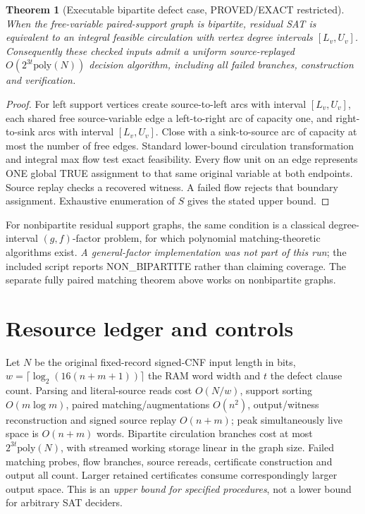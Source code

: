 \documentclass[10pt]{article}
\newtheorem{theorem}{Theorem}
\begin{document}
\begin{theorem}[Executable bipartite defect case, PROVED/EXACT restricted]
When the free-variable paired-support graph is bipartite, residual SAT is equivalent to an integral feasible circulation with vertex degree intervals $[L_v,U_v]$. Consequently these checked inputs admit a uniform source-replayed $O(2^{3t}\mathrm{poly}(N))$ decision algorithm, including all failed branches, construction and verification.
\end{theorem}
\begin{proof}
For left support vertices create source-to-left arcs with interval $[L_v,U_v]$, each shared free source-variable edge a left-to-right arc of capacity one, and right-to-sink arcs with interval $[L_v,U_v]$. Close with a sink-to-source arc of capacity at most the number of free edges. Standard lower-bound circulation transformation and integral max flow test exact feasibility. Every flow unit on an edge represents ONE global TRUE assignment to that same original variable at both endpoints. Source replay checks a recovered witness. A failed flow rejects that boundary assignment. Exhaustive enumeration of $S$ gives the stated upper bound.
\end{proof}
For nonbipartite residual support graphs, the same condition is a classical degree-interval $(g,f)$-factor problem, for which polynomial matching-theoretic algorithms exist. \emph{A general-factor implementation was not part of this run}; the included script reports NON\_BIPARTITE rather than claiming coverage. The separate fully paired matching theorem above works on nonbipartite graphs.

\section{Resource ledger and controls}
Let $N$ be the original fixed-record signed-CNF input length in bits, $w=\lceil\log_2(16(n+m+1))\rceil$ the RAM word width and $t$ the defect clause count. Parsing and literal-source reads cost $O(N/w)$, support sorting $O(m\log m)$, paired matching/augmentations $O(n^2)$, output/witness reconstruction and signed source replay $O(n+m)$; peak simultaneously live space is $O(n+m)$ words. Bipartite circulation branches cost at most $2^{3t}\mathrm{poly}(N)$, with streamed working storage linear in the graph size. Failed matching probes, flow branches, source rereads, certificate construction and output all count. Larger retained certificates consume correspondingly larger output space. This is an \emph{upper bound for specified procedures}, not a lower bound for arbitrary SAT deciders.
\end{document}
